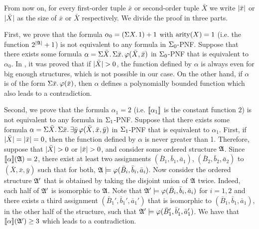 
From now on, for every first-order tuple $\bar{x}$ or second-order tuple $\bar{X}$ we write $\vert \bar{x} \vert$ or $\vert \bar{X} \vert$ as the size of $\bar{x}$ or $\bar{X}$ respectively. We divide the proof in three parts.

First, we prove that the formula $\alpha_{0} = \left( \Sigma{X}.\, 1 \right) + 1$ with ${\rm arity}(X) = 1$ (i.e. the function $2^{\vert\mathfrak{A}\vert}+1$) is not equivalent to any formula in $\Sigma_{0}$-PNF. Suppose that there exists some formula $\alpha = \Sigma{\bar{X}}.\,\Sigma{\bar{x}}.\,\varphi(\bar{X},\bar{x})$ in $\Sigma_{0}$-PNF that is equivalent to $\alpha_0$.
In \cite{SalujaST95}, it was proved that if $\vert \bar{X} \vert > 0$, the function defined by $\alpha$ is always even for big enough structures, which is not possible in our case.
On the other hand, if $\alpha$ is of the form $\Sigma{\bar{x}}.\,\varphi(\bar{x})$, then $\alpha$ defines a polynomially bounded function which also leads to a contradiction.

Second, we prove that the formula $\alpha_{1} = 2$ (i.e. ${\llbracket{}{\alpha_{1}}\rrbracket}$ is the constant function $2$) is not equivalent to any formula in $\Sigma_{1}$-PNF. Suppose that there exists some formula $\alpha = \Sigma{\bar{X}}.\,\Sigma{\bar{x}}.\,\exists\bar{y}\, \varphi(\bar{X},\bar{x},\bar{y})$ in $\Sigma_{1}$-PNF that is equivalent to $\alpha_1$. 
First, if $\vert \bar{X} \vert = \vert \bar{x} \vert = 0$, then the function defined by $\alpha$ is never greater than 1. 
Therefore, suppose that $\vert \bar{X} \vert > 0$ or $\vert \bar{x} \vert > 0$, and consider some ordered structure $\mathfrak{A}$. 
Since ${\llbracket{}{\alpha}\rrbracket}(\mathfrak{A}) = 2$, there exist at least two assignments $(\bar{B}_1,\bar{b}_1,\bar{a}_1)$, $(\bar{B}_2,\bar{b}_2,\bar{a}_2)$ to $(\bar{X},\bar{x},\bar{y})$ such that for both, $\mathfrak{A}\models\varphi(\bar{B}_i,\bar{b}_i,\bar{a}_i)$. Now consider the ordered structure $\mathfrak{A}'$ that is obtained by taking the disjoint union of $\mathfrak{A}$ twice. Indeed, each half of $\mathfrak{A}'$ is isomorphic to $\mathfrak{A}$. Note that $\mathfrak{A}'\models\varphi(\bar{B}_i,\bar{b}_i,\bar{a}_i)$ for $i = 1,2$ and there exists a third assignment $(\bar{B}_1',\bar{b}_1',\bar{a}_1')$ that is isomorphic to $(\bar{B}_1,\bar{b}_1,\bar{a}_1)$, in the other half of the structure, such that $\mathfrak{A}'\models\varphi(\bar{B}_1',\bar{b}_1',\bar{a}_1')$. We have that ${\llbracket{}{\alpha}\rrbracket}(\mathfrak{A}') \geq 3$ which leads to a contradiction.

